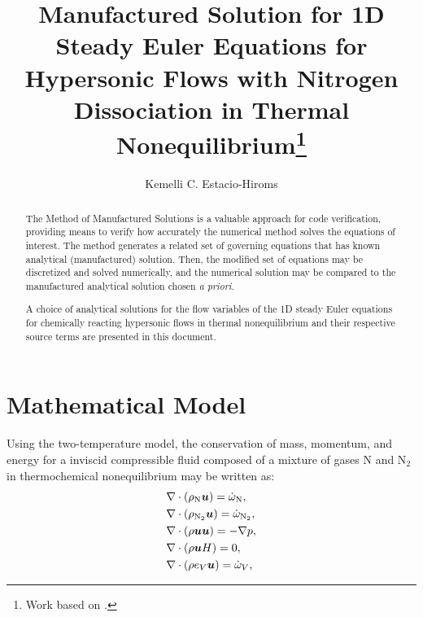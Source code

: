 \documentclass[10pt]{article}
\title{Manufactured Solution for 1D Steady Euler Equations for Hypersonic Flows with Nitrogen Dissociation in Thermal Nonequilibrium\footnote{Work based on \citet*{Kirk2009}.}}
\author{Kemelli C. Estacio-Hiroms}
\newcommand{\bv}[1]{\ensuremath{\mbox{\boldmath$ #1 $}}}
\begin{document}
\maketitle
\tableofcontents
\begin{abstract}
The Method of Manufactured Solutions is a valuable approach for code verification, providing means to verify how accurately the numerical method solves the equations of interest. The method generates a related set of governing equations that has known analytical (manufactured) solution. Then, the modified set of equations may be discretized and solved numerically, and the numerical solution may be compared to the manufactured analytical solution  chosen \textit{a priori}.

A choice of analytical solutions for the flow variables of the 1D steady Euler equations for chemically reacting hypersonic flows in thermal nonequilibrium  and their respective source terms are presented in this document.
\end{abstract}





\section{Mathematical Model}
Using the two-temperature model, the conservation of mass, momentum, and energy for a inviscid compressible fluid composed of a  mixture of gases N and N$_2$ in thermochemical nonequilibrium may be written as:
\begin{align}
\label{eq:euler:rhoN}
&\nabla \cdot \left(\rho_{\text{N}} \bv{u}\right) = \dot{\omega}_{\text{N}},\vspace{5pt} \\
 \label{eq:euler:rhoN2}
&\nabla \cdot \left(\rho_{\text{N}_2}\bv{u}\right) = \dot{\omega}_{\text{N}_2},\vspace{5pt}\\
\label{eq:euler:u}
&\nabla\cdot\left(\rho\bv{u}\bv{u}\right) = -\nabla p,\vspace{5pt} \\
\label{eq:euler:E}
&\nabla\cdot\left(\rho \bv{u} H\right) = 0,\vspace{5pt} \\
\label{eq:euler:eV}
&\nabla\cdot (\rho e_V \bv{u})= \dot{\omega}_V ,
\end{align}
\end{document}
